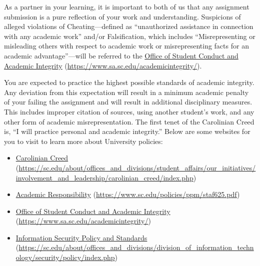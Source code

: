 \documentclass[11pt,letterpaper]{article}
\begin{document}



As a partner in your learning, it is important to both of us that any assignment submission is a pure reflection of your work and understanding. Suspicions of alleged violations of Cheating---defined as ``unauthorized assistance in connection with any academic work'' and/or Falsification, which includes ``Misrepresenting or misleading others with respect to academic work or misrepresenting facts for an academic advantage''---will be referred to the \href{https://www.sa.sc.edu/academicintegrity/}{Office of Student Conduct and Academic Integrity} (\url{https://www.sa.sc.edu/academicintegrity/}). \pspace

You are expected to practice the highest possible standards of academic integrity. Any deviation from this expectation will result in a minimum academic penalty of your failing the assignment and will result in additional disciplinary measures. This includes improper citation of sources, using another student's work, and any other form of academic misrepresentation. The first tenet of the Carolinian Creed is, ``I will practice personal and academic integrity.'' Below are some websites for you to visit to learn more about University policies:
	\begin{itemize}
	\item \href{https://sc.edu/about/offices\_and\_divisions/student\_affairs/our\_initiatives/involvement\_and\_leadership/carolinian\_creed/index.php}{Carolinian Creed} (\url{https://sc.edu/about/offices\_and\_divisions/student\_affairs/our\_initiatives/involvement\_and\_leadership/carolinian\_creed/index.php})
	\item \href{https://www.sc.edu/policies/ppm/staf625.pdf}{Academic Responsibility} (\url{https://www.sc.edu/policies/ppm/staf625.pdf})
	\item \href{https://www.sa.sc.edu/academicintegrity/}{Office of Student Conduct and Academic Integrity} (\url{https://www.sa.sc.edu/academicintegrity/})
	\item \href{https://sc.edu/about/offices\_and\_divisions/division\_of\_information\_technology/security/policy/index.php}{Information Security Policy and Standards} (\url{https://sc.edu/about/offices\_and\_divisions/division\_of\_information\_technology/security/policy/index.php})
	\end{itemize} \pvspace{0.1cm}
\end{document}
